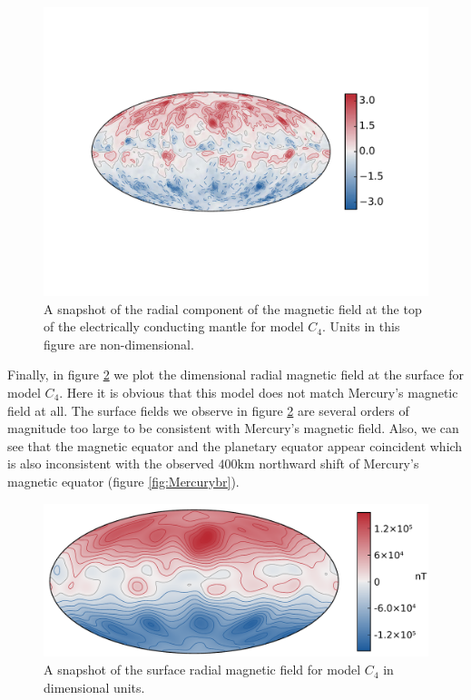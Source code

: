 \begin{figure}
	\centering
	\includegraphics[width=.8\linewidth]{Chapter5/Figures/br11_004_1631_104.pdf}
	\caption{A snapshot of the radial component of the magnetic field at the top of the electrically conducting mantle for model $C_4$. Units in this figure are non-dimensional.}
        \label{fig:fesbrddp}
\end{figure}

Finally, in figure \ref{fig:fessurf} we plot the dimensional radial magnetic field at the surface for model $C_4$. Here it is obvious that this model does not match Mercury's magnetic field at all. The surface fields we observe in figure \ref{fig:fessurf} are several orders of magnitude too large to be consistent with Mercury's magnetic field. Also, we can see that the magnetic equator and the planetary equator appear coincident which is also inconsistent with the observed $400\textrm{km}$ northward shift of Mercury's magnetic equator (figure \ref{fig:Mercurybr}).
\begin{figure}
	\centering
        \includegraphics[width=\linewidth]{Chapter5/Figures/br11_004_1631_surf.pdf} 
        \caption{A snapshot of the surface radial magnetic field for model $C_4$ in dimensional units.}
        \label{fig:fessurf}
\end{figure}

